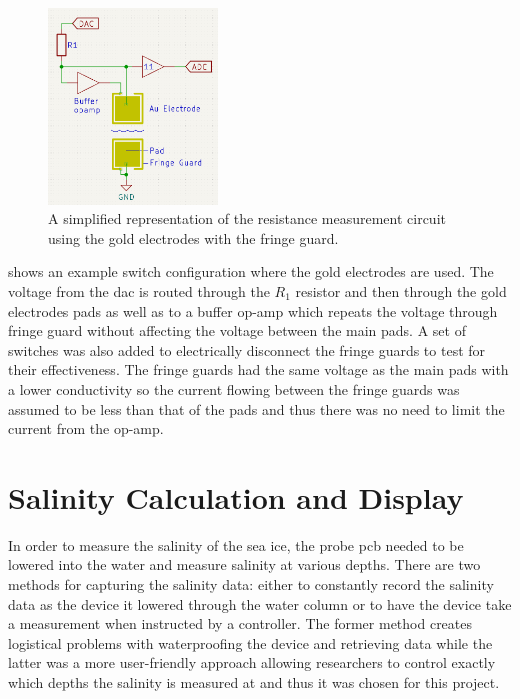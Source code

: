\begin{figure}[!h]
    \centering
    \includegraphics[width=0.4\textwidth]{Figures/AuElectrodeExample}
    \caption{A simplified representation of the resistance measurement circuit using the gold electrodes with the fringe guard.}
    \label{fig:au-measurement-circuit} %
\end{figure}

 shows an example switch configuration where the gold electrodes are used.
The voltage from the \gls{dac} is routed through the $R_1$ resistor and then through the gold electrodes pads as well as to a buffer op-amp which repeats the voltage through fringe guard without affecting the voltage between the main pads. 
A set of switches was also added to electrically disconnect the fringe guards to test for their effectiveness.
The fringe guards had the same voltage as the main pads with a lower conductivity so the current flowing between the fringe guards was assumed to be less than that of the pads and thus there was no need to limit the current from the op-amp.

\section{Salinity Calculation and Display}

In order to measure the salinity of the sea ice, the probe \gls{pcb} needed to be lowered into the water and measure salinity at various depths.
There are two methods for capturing the salinity data: either to constantly record the salinity data as the device it lowered through the water column or to have the device take a measurement when instructed by a controller.
The former method creates logistical problems with waterproofing the device and retrieving data while the latter was a more user-friendly approach allowing researchers to control exactly which depths the salinity is measured at and thus it was chosen for this project.

